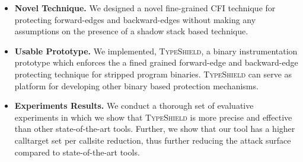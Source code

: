 \label{Contribution}
\begin{itemize}
[leftmargin=.35cm]

 \item 
 \textbf{Novel Technique.} 
 We designed a novel fine-grained CFI technique for protecting forward-edges and backward-edges 
 without making any assumptions on the presence of a shadow stack based technique.
 
 \item 
 \textbf{Usable Prototype.} 
 We implemented, \textsc{TypeShield}, a binary instrumentation prototype which enforces the a fined grained forward-edge and backward-edge protecting technique
 for stripped program binaries. \textsc{TypeShield} can serve as platform for developing other binary based protection mechanisms.
 
 \item 
 \textbf{Experiments Results.}
 We conduct a thorough set of evaluative experiments in which we show that \textsc{TypeShield} is more precise and effective than 
 other state-of-the-art tools. Further, we show that our tool has a higher calltarget set per callsite reduction, thus 
 further reducing the attack surface compared to state-of-the-art tools.
 
\end{itemize}
